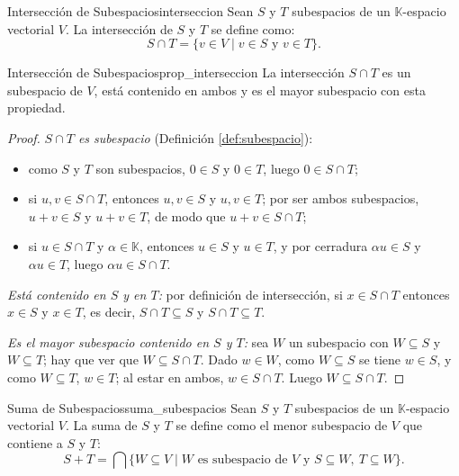 \documentclass[11pt, a4paper]{article}
\begin{document}
\begin{definicion}{Intersección de Subespacios}{interseccion}
Sean $S$ y $T$ subespacios de un $\mathbb{K}$-espacio vectorial $V$. La intersección de $S$ y $T$ se define como:
\[
S \cap T = \{ v \in V \mid v \in S \text{ y } v \in T \}.
\]
\end{definicion}

\begin{proposicion}{Intersección de Subespacios}{prop_interseccion}
La intersección $S \cap T$ es un subespacio de $V$, está contenido en ambos y es el mayor subespacio con esta propiedad.
\end{proposicion}

\begin{proof}
\textit{$S \cap T$ es subespacio} (Definición \ref{def:subespacio}):
\begin{itemize}
    \item como $S$ y $T$ son subespacios, $0 \in S$ y $0 \in T$, luego $0 \in S \cap T$;
    \item si $u, v \in S \cap T$, entonces $u, v \in S$ y $u, v \in T$; por ser ambos subespacios, $u+v \in S$ y $u+v \in T$, de modo que $u+v \in S \cap T$;
    \item si $u \in S \cap T$ y $\alpha \in \mathbb{K}$, entonces $u \in S$ y $u \in T$, y por cerradura $\alpha u \in S$ y $\alpha u \in T$, luego $\alpha u \in S \cap T$.
\end{itemize}

\textit{Está contenido en $S$ y en $T$:} por definición de intersección, si $x \in S \cap T$ entonces $x \in S$ y $x \in T$, es decir, $S \cap T \subseteq S$ y $S \cap T \subseteq T$.

\textit{Es el mayor subespacio contenido en $S$ y $T$:} sea $W$ un subespacio con $W \subseteq S$ y $W \subseteq T$; hay que ver que $W \subseteq S \cap T$. Dado $w \in W$, como $W \subseteq S$ se tiene $w \in S$, y como $W \subseteq T$, $w \in T$; al estar en ambos, $w \in S \cap T$. Luego $W \subseteq S \cap T$.
\end{proof}

\begin{definicion}{Suma de Subespacios}{suma_subespacios}
Sean $S$ y $T$ subespacios de un $\mathbb{K}$-espacio vectorial $V$. La suma de $S$ y $T$ se define como el menor subespacio de $V$ que contiene a $S$ y $T$:
\[
S + T = \bigcap \{ W \subseteq V \mid W \text{ es subespacio de $V$ y } S \subseteq W, \ T \subseteq W \}.
\]
\end{definicion}
\end{document}
